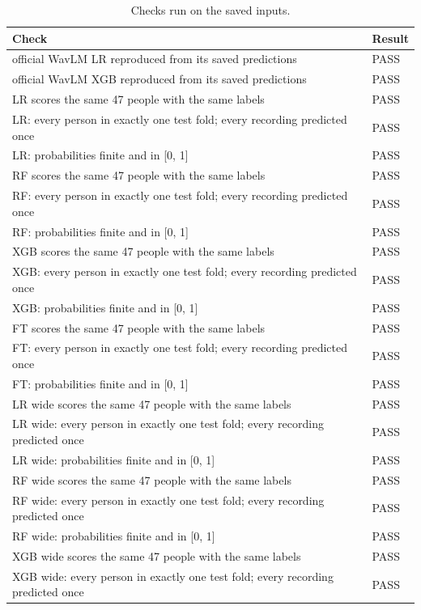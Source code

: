 \documentclass[11pt,a4paper]{article}
\begin{document}
\begin{table}[H]\centering\scriptsize\renewcommand{\arraystretch}{1.15}
\caption{Checks run on the saved inputs.}
\begin{tabular}{p{13.3cm}l}
\toprule
\textbf{Check} & \textbf{Result}\\
\midrule
official WavLM LR reproduced from its saved predictions & PASS\\
official WavLM XGB reproduced from its saved predictions & PASS\\
LR scores the same 47 people with the same labels & PASS\\
LR: every person in exactly one test fold; every recording predicted once & PASS\\
LR: probabilities finite and in [0, 1] & PASS\\
RF scores the same 47 people with the same labels & PASS\\
RF: every person in exactly one test fold; every recording predicted once & PASS\\
RF: probabilities finite and in [0, 1] & PASS\\
XGB scores the same 47 people with the same labels & PASS\\
XGB: every person in exactly one test fold; every recording predicted once & PASS\\
XGB: probabilities finite and in [0, 1] & PASS\\
FT scores the same 47 people with the same labels & PASS\\
FT: every person in exactly one test fold; every recording predicted once & PASS\\
FT: probabilities finite and in [0, 1] & PASS\\
LR wide scores the same 47 people with the same labels & PASS\\
LR wide: every person in exactly one test fold; every recording predicted once & PASS\\
LR wide: probabilities finite and in [0, 1] & PASS\\
RF wide scores the same 47 people with the same labels & PASS\\
RF wide: every person in exactly one test fold; every recording predicted once & PASS\\
RF wide: probabilities finite and in [0, 1] & PASS\\
XGB wide scores the same 47 people with the same labels & PASS\\
XGB wide: every person in exactly one test fold; every recording predicted once & PASS\\

\end{tabular}
\end{table}
\end{document}
